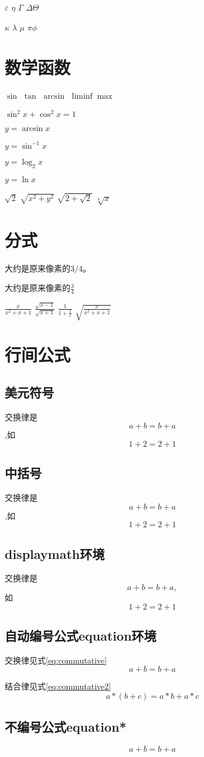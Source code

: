\documentclass{article}
\begin{document}
	$\varepsilon $ \quad $\eta $ \quad $\Gamma $ \quad $\Delta $\quad $\Theta $
	
	$\kappa $ \quad $\lambda $ \quad $\mu $ \quad $\pi $\quad $\phi$
	\section{数学函数}
	$\sin  $ \quad $\tan$ \quad $\arcsin $ \quad $\liminf $\quad $\max  $
	
	$\sin^2x + \cos^2x = 1$
	
	$y = \arcsin x$
	
	$y = \sin^{-1} x$
	
	$y =\log_2 x$
	
	$y = \ln x$
	
	$\sqrt{2}$ \quad $\sqrt{x^2 + y^2}$ \quad $\sqrt{2 + \sqrt{2}}$ \quad $\sqrt[4]{x}$
	\section{分式}
	大约是原来像素的$3/4$。
	
	大约是原来像素的$\frac{3}{4}$
	
	$\frac{x}{x^2+x+1}$ \quad $\frac{\sqrt{x-1}}{\sqrt{x+1}}$ \quad  $\frac{1}{1+\frac{1}{x}}$ \quad $\sqrt{\frac{x}{x^2 +x +1}}$
	
	\section{行间公式}
		\subsection{美元符号}
		交换律是$$a+b = b+a $$,如$$1+2 = 2+1$$
		\subsection{中括号}
		交换律是\[a+b = b+a\] ,如\[1+2 = 2+1\]
		\subsection{displaymath环境}
		交换律是
		\begin{displaymath}
			a+b = b+a,
		\end{displaymath}
		如
		\begin{displaymath}
		1+2 = 2+1
		\end{displaymath}
		\subsection{自动编号公式equation环境}
		交换律见式\ref{eq:commutative}
		\begin{equation}
			a+b = b+a \label{eq:commutative}
		\end{equation}
		
		结合律见式\ref{eq:commutative2}
		\begin{equation}
		a*(b+c) = a*b+a*c \label{eq:commutative2}
		\end{equation}
		\subsection{不编号公式equation*}
		\begin{equation*}
			a+b = b+a
		\end{equation*}
\end{document}
